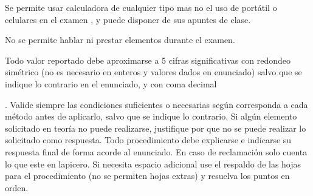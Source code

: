 \documentclass[12pt]{article}
\begin{document}
{\scriptsize

Se permite usar calculadora de cualquier tipo mas no el uso de portátil o celulares en el examen%
, y puede disponer de sus apuntes de clase. %

No se permite hablar ni prestar elementos durante el examen. %

Todo valor reportado debe aproximarse a 5 cifras significativas con redondeo simétrico (no es necesario en enteros y valores dados en enunciado) salvo que se indique lo contrario en el enunciado, y con coma decimal%

.
Valide siempre las condiciones suficientes o necesarias según corresponda a cada método antes de aplicarlo, salvo que se indique lo contrario. Si algún elemento solicitado en teoría no puede realizarse, justifique por que no se puede realizar lo solicitado como respuesta. Todo procedimiento debe explicarse e indicarse su respuesta final de forma acorde al enunciado. %
En caso de reclamación solo cuenta lo que este en lapicero. %
Si necesita espacio adicional %
use el respaldo de las hojas para el procedimiento (no se permiten hojas extras) y resuelva los puntos en orden. %



}
\end{document}
